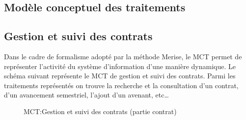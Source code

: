 \documentclass[a4paper]{report}
\begin{document}
\begin{doublespace}
	\section{Modèle conceptuel des traitements}
	\subsection{Gestion et suivi des contrats}

	Dans le cadre de formalisme adopté par la méthode Merise, le MCT permet de représenter l’activité du
	système d’information d’une manière dynamique.
	Le schéma suivant représente le MCT de gestion et suivi des contrats. Parmi les traitements représentés
	on trouve la recherche et la consultation d'un contrat, d'un avancement semestriel,
	l'ajout d'un avenant, etc\dots

	\begin{figure}[H]
		\begin{center}
			\caption{MCT:Gestion et suivi des contrats (partie contrat)}
		\end{center}
	\end{figure}


\end{doublespace}
\end{document}
